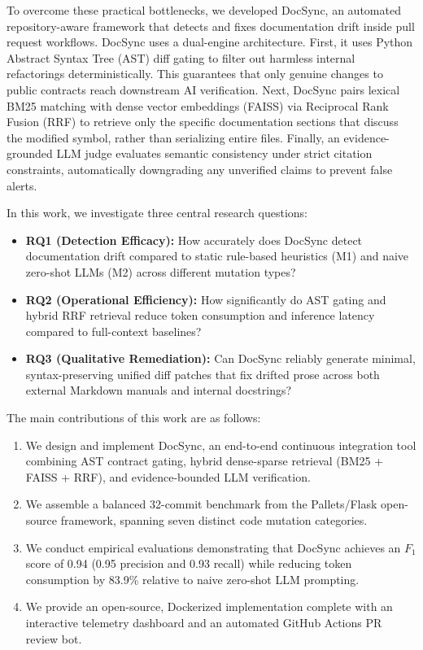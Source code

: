 \documentclass[12pt,onecolumn,draftclsnofoot]{IEEEtran}
\begin{document}
To overcome these practical bottlenecks, we developed DocSync, an automated repository-aware framework that detects and fixes documentation drift inside pull request workflows. DocSync uses a dual-engine architecture. First, it uses Python Abstract Syntax Tree (AST) diff gating to filter out harmless internal refactorings deterministically. This guarantees that only genuine changes to public contracts reach downstream AI verification. Next, DocSync pairs lexical BM25 matching with dense vector embeddings (FAISS) via Reciprocal Rank Fusion (RRF) to retrieve only the specific documentation sections that discuss the modified symbol, rather than serializing entire files. Finally, an evidence-grounded LLM judge evaluates semantic consistency under strict citation constraints, automatically downgrading any unverified claims to prevent false alerts.

In this work, we investigate three central research questions:
\begin{itemize}
    \item \textbf{RQ1 (Detection Efficacy):} How accurately does DocSync detect documentation drift compared to static rule-based heuristics (M1) and naive zero-shot LLMs (M2) across different mutation types?
    \item \textbf{RQ2 (Operational Efficiency):} How significantly do AST gating and hybrid RRF retrieval reduce token consumption and inference latency compared to full-context baselines?
    \item \textbf{RQ3 (Qualitative Remediation):} Can DocSync reliably generate minimal, syntax-preserving unified diff patches that fix drifted prose across both external Markdown manuals and internal docstrings?
\end{itemize}

The main contributions of this work are as follows:
\begin{enumerate}
    \item We design and implement DocSync, an end-to-end continuous integration tool combining AST contract gating, hybrid dense-sparse retrieval (BM25 + FAISS + RRF), and evidence-bounded LLM verification.
    \item We assemble a balanced 32-commit benchmark from the Pallets/Flask open-source framework, spanning seven distinct code mutation categories.
    \item We conduct empirical evaluations demonstrating that DocSync achieves an $F_1$ score of 0.94 (0.95 precision and 0.93 recall) while reducing token consumption by 83.9\% relative to naive zero-shot LLM prompting.
    \item We provide an open-source, Dockerized implementation complete with an interactive telemetry dashboard and an automated GitHub Actions PR review bot.
\end{enumerate}
\end{document}
